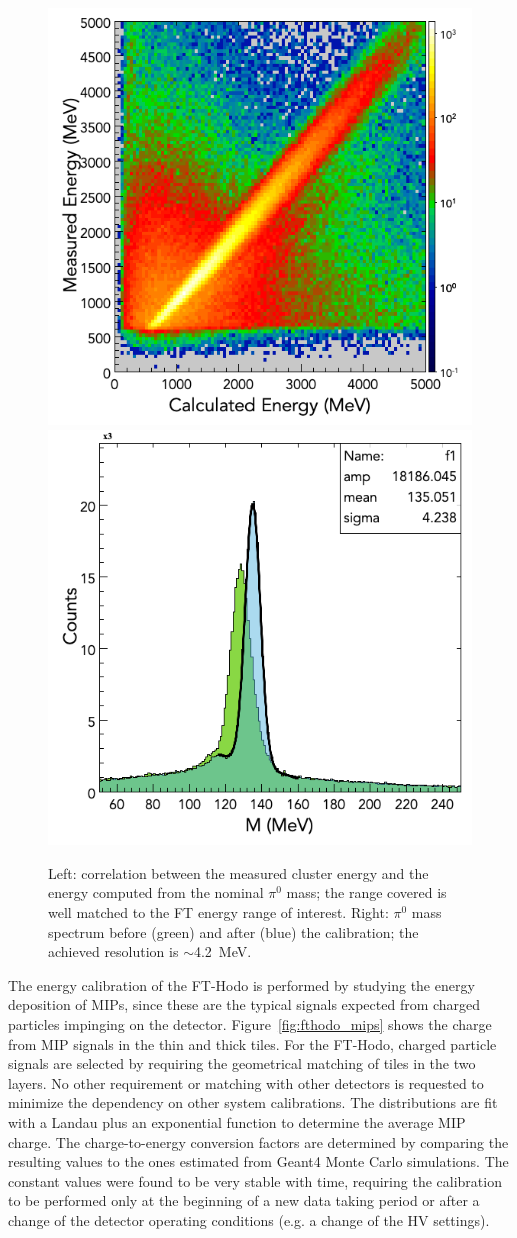 \begin{figure}
\includegraphics[height=0.48\columnwidth]{fig/ftcal_pi0linearity.png}
\includegraphics[height=0.48\columnwidth]{fig/ftcal_pi0resolution.png}
\caption{Left: correlation between the measured cluster energy and the energy computed from the nominal $\pi^0$
  mass; the range covered is well matched to the FT energy range of interest. Right: $\pi^0$ mass spectrum before
  (green) and after (blue) the calibration; the achieved resolution is $\sim$4.2~MeV.}
\label{fig:ftcal_pi0res}
\end{figure}

The energy calibration of the FT-Hodo is performed by studying the energy deposition of MIPs, since these are the
typical signals expected from charged particles impinging on the detector. Figure~\ref{fig:fthodo_mips} shows the
charge from MIP signals in the thin and thick tiles. For the FT-Hodo, charged particle signals are selected by requiring
the geometrical matching of tiles in the two layers. No other requirement or matching with other detectors is requested
to minimize the dependency on other system calibrations. The distributions are fit with a Landau plus an exponential
function to determine the average MIP charge. The charge-to-energy conversion factors are determined by comparing
the resulting values to the ones estimated from Geant4 Monte Carlo simulations. The constant values were found to be
very stable with time, requiring the calibration to be performed only at the beginning of a new data taking period or
after a change of the detector operating conditions (e.g. a change of the HV settings).

